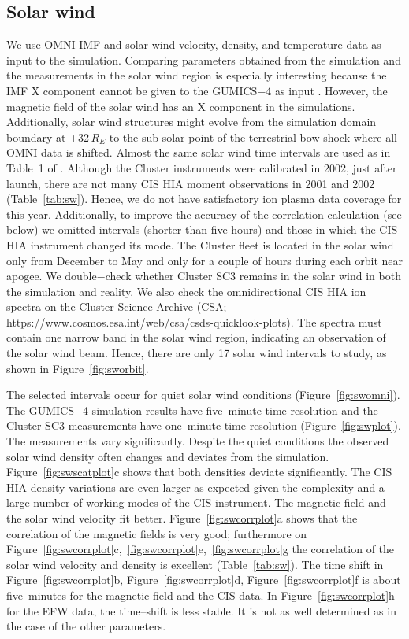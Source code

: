 \documentclass[draft]{agujournal2019}
\begin{document}
\subsection{Solar wind}
\label{sec:sw}

We use OMNI IMF and solar wind velocity, density, and temperature data as input to the simulation. Comparing parameters obtained from the simulation and the measurements in the solar wind region is especially interesting because the IMF X component cannot be given to the GUMICS$-$4 as input \cite{janhunen12:_gumic_mhd,facsko16:_one_earth}. However, the magnetic field of the solar wind has an X component in the simulations. Additionally, solar wind structures might evolve from the simulation domain boundary at +32\,$R_E$ to the sub-solar point of the terrestrial bow shock where all OMNI data is shifted. Almost the same solar wind time intervals are used as in Table~1 of . Although the Cluster instruments were calibrated in 2002, just after launch, there are not many CIS HIA moment observations in 2001 and 2002 (Table~\ref{tab:sw}). Hence, we do not have satisfactory ion plasma data coverage for this year. Additionally, to improve the accuracy of the correlation calculation (see below) we omitted intervals (shorter than five hours) and those in which the CIS HIA instrument changed its mode. The Cluster fleet is located in the solar wind only from December to May and only for a couple of hours during each orbit near apogee. We double$-$check whether Cluster SC3 remains in the solar wind in both the simulation and reality. We also check the omnidirectional CIS HIA ion spectra on the Cluster Science Archive (CSA; https://www.cosmos.esa.int/web/csa/csds-quicklook-plots). The spectra must contain one narrow band in the solar wind region, indicating an observation of the solar wind beam. Hence, there are only 17 solar wind intervals to study, as shown in Figure~\ref{fig:sworbit}. 

The selected intervals occur for quiet solar wind conditions (Figure~\ref{fig:swomni}). The GUMICS$-$4 simulation results have five--minute time resolution and the Cluster SC3 measurements have one--minute time resolution (Figure~\ref{fig:swplot}). The measurements vary significantly. Despite the quiet conditions the observed solar wind density often changes and deviates from the simulation. Figure~\ref{fig:swscatplot}c shows that both densities deviate significantly. The CIS HIA density variations are even larger as expected given the complexity and a large number of working modes of the CIS instrument. The magnetic field and the solar wind velocity fit better. Figure~\ref{fig:swcorrplot}a shows that the correlation of the magnetic fields is very good; furthermore on Figure~\ref{fig:swcorrplot}c,~\ref{fig:swcorrplot}e,~\ref{fig:swcorrplot}g the correlation of the solar wind velocity and density is excellent (Table~\ref{tab:sw}). The time shift in Figure~\ref{fig:swcorrplot}b, Figure~\ref{fig:swcorrplot}d, Figure~\ref{fig:swcorrplot}f is about five--minutes for the magnetic field and the CIS data. In Figure~\ref{fig:swcorrplot}h for the EFW data, the time--shift is less stable. It is not as well determined as in the case of the other parameters.
\end{document}
